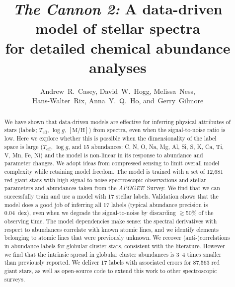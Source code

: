 \documentclass[12pt,preprint]{aastex6}
\newcommand{\project}[1]{\textsl{#1}}
\newcommand{\acronym}[1]{{\small{#1}}}
\newcommand{\apogee}{\project{\acronym{APOGEE}}}
\newcommand{\logg}{\log g}
\newcommand{\mh}{\mathrm{[M/H]}}
\newcommand{\Teff}{T_{\mathrm{eff}}}
\begin{document}
\title{\textsl{The Cannon 2:} A data-driven model of stellar spectra \\
       for detailed chemical abundance analyses}
     
\author{Andrew~R.~Casey,
        David~W.~Hogg,
        Melissa~Ness,\\
        Hans-Walter~Rix,
        Anna~Y.~Q.~Ho,
    and~Gerry~Gilmore}
 



\begin{abstract}
We have shown that data-driven models are effective for inferring physical 
attributes of stars (labels; $\Teff$, $\logg$, $\mh$) from spectra, even when
the signal-to-noise ratio is low.
Here we explore whether this is possible when the dimensionality of the label
space is large ($\Teff$, $\logg$, and 15 abundances: C, N, O, Na, Mg, Al, Si, S, 
K, Ca, Ti, V, Mn, Fe, Ni) and the model is non-linear in its response to 
abundance and parameter changes.
We adopt ideas from compressed sensing to limit overall model complexity
while retaining model freedom.  The model is trained
with a set of 12,681 red giant stars with high signal-to-noise spectroscopic 
observations and stellar parameters and abundances taken from the \apogee\ 
Survey.
We find that we can successfully train and use a model with 17 stellar labels.
Validation shows that the model does a good job of inferring all 17 labels 
(typical abundance precision is 0.04~dex), even when we degrade the signal-to-noise by 
discarding $\gtrsim$50\% of the observing time. The model dependencies 
make sense: the spectral derivatives with respect to abundances correlate
with known atomic lines, and we identify elements belonging
to atomic lines that were previously unknown.  We recover (anti-)correlations
in abundance labels for globular cluster stars, consistent with the literature.
However we find that the intrinsic spread in globular cluster abundances is 3--4 times smaller than 
previously reported.  We deliver 17 labels with associated errors for 
87,563 red giant stars, as well as open-source code to extend this work to other spectroscopic surveys.
\end{abstract}
\end{document}
